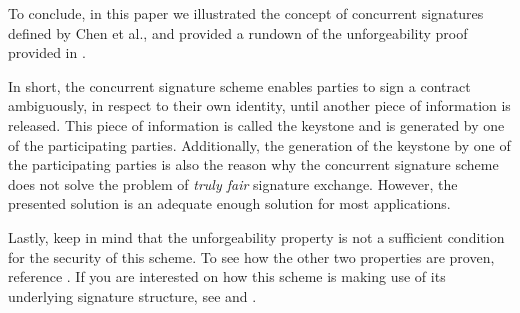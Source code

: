To conclude, in this paper we illustrated the concept of concurrent signatures defined by Chen et al., and provided a rundown of the unforgeability proof provided in \cite{chen2004concurrent}.

In short, the concurrent signature scheme enables parties to sign a contract ambiguously, in respect to their own identity, until another piece of information is released.
This piece of information is called the keystone and is generated by one of the participating parties.
Additionally, the generation of the keystone by one of the participating parties is also the reason why the concurrent signature scheme does not solve the problem of \textit{truly fair} signature exchange.
However, the presented solution is an adequate enough solution for most applications.

Lastly, keep in mind that the unforgeability property is not a sufficient condition for the security of this scheme.
To see how the other two properties are proven, reference \cite{chen2004concurrent}.
If you are interested on how this scheme is making use of its underlying signature structure, see \cite{abe20021} and \cite{schnorr1991efficient}.